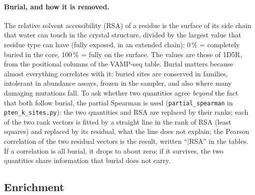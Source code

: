 \documentclass[11pt,a4paper]{article}
\newcommand{\file}[1]{\texttt{#1}}
\begin{document}
\paragraph{Burial, and how it is removed.} The relative solvent
accessibility (RSA) of a residue is the surface of its side chain that water
can touch in the crystal structure, divided by the largest value that residue
type can have (fully exposed, in an extended chain): 0\,\% = completely
buried in the core, 100\,\% = fully on the surface. The values are those of
1D5R, from the positional columns of the VAMP-seq table. Burial matters
because almost everything correlates with it: buried sites are conserved in
families, intolerant in abundance assays, frozen in the sampler, and also
where many damaging mutations fall. To ask whether two quantities agree
\emph{beyond} the fact that both follow burial, the partial Spearman is used
(\texttt{partial\_spearman} in \file{pten\_k\_sites.py}): the two quantities
and RSA are replaced by their ranks; each of the two rank vectors is fitted
by a straight line in the rank of RSA (least squares) and replaced by its
residual, what the line does not explain; the Pearson correlation of the two
residual vectors is the result, written ``$|$RSA'' in the tables. If a
correlation is all burial, it drops to about zero; if it survives, the two
quantities share information that burial does not carry.

\subsection{Enrichment}
\end{document}

